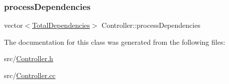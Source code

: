 \mbox{\label{classController_ae8234cd96adbdeff4b56a59f6c54df58}} 
\subsubsection{\texorpdfstring{process\+Dependencies}{processDependencies}}
{\footnotesize\ttfamily vector$<$\hyperlink{classTotalDependencies}{Total\+Dependencies}$>$ Controller\+::process\+Dependencies\hspace{0.3cm}{\ttfamily [private]}}



The documentation for this class was generated from the following files\+:\begin{DoxyCompactItemize}
\item 
src/\hyperlink{Controller_8h}{Controller.\+h}\item 
src/\hyperlink{Controller_8cc}{Controller.\+cc}\end{DoxyCompactItemize}
